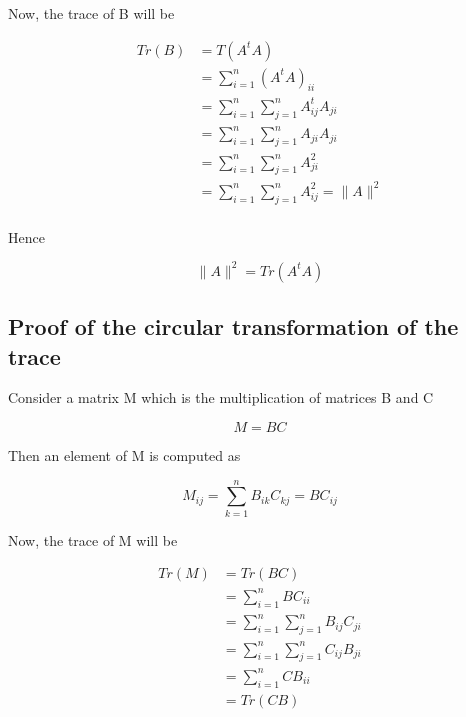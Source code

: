\documentclass[12pt,journal]{IEEEtran}
\begin{document}
    Now, the trace of B will be

    \begin{equation*}
        \begin{aligned}
            Tr(B) &= T(A^tA)\\
                  &= \sum_{i=1}^n (A^tA)_{ii}\\
                  &= \sum_{i=1}^n \sum_{j=1}^n A_{ij}^t A_{ji}\\
                  &= \sum_{i=1}^n \sum_{j=1}^n A_{ji} A_{ji}\\
                  &= \sum_{i=1}^n \sum_{j=1}^n A_{ji}^2 \\
                  &= \sum_{i=1}^n \sum_{j=1}^n A_{ij}^2 = \lVert A \rVert^2 \\
        \end{aligned}
    \end{equation*}

    Hence

    \begin{equation*}
        \lVert A \rVert^2 = Tr(A^tA)
    \end{equation*}

    \subsection{Proof of the circular transformation of the trace} \label{circular_trace}

    Consider a matrix M which is the multiplication of matrices B and C

    \begin{equation*}
        M = BC
    \end{equation*}

    Then an element of M is computed as

    \begin{equation*}
        M_{ij} = \sum_{k=1}^n B_{ik} C_{kj} = BC_{ij}
    \end{equation*}

    Now, the trace of M will be

    \begin{equation*}
        \begin{aligned}
            Tr(M) &= Tr(BC)\\
                  &= \sum_{i=1}^n BC_{ii}\\
                  &= \sum_{i=1}^n \sum_{j=1}^n B_{ij} C_{ji}\\
                  &= \sum_{i=1}^n \sum_{j=1}^n C_{ij} B_{ji}\\
                  &= \sum_{i=1}^n CB_{ii}\\
                  &= Tr(CB)
        \end{aligned}
    \end{equation*}
\end{document}
